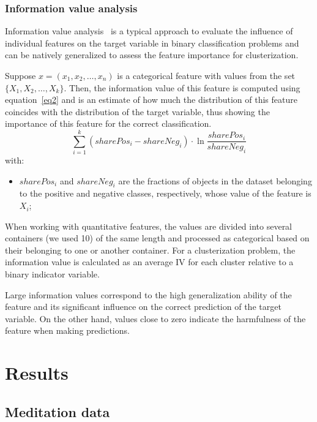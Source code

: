 \documentclass[pdflatex,sn-basic,Numbered]{sn-jnl}
\begin{document}
\subsubsection{Information value analysis}

Information value analysis~\cite{InformationValue} is a typical approach to evaluate the influence of individual features on the target variable in binary classification problems and can be natively generalized to assess the feature importance for clusterization.

Suppose $x=(x_1, x_2, \ldots, x_n)$ is a categorical feature with values from the set $\{ X_1, X_2, \ldots, X_k \}$. Then, the information value of this feature is computed using equation~\eqref{eq2} and is an estimate of how much the distribution of this feature coincides with the distribution of the target variable, thus showing the importance of this feature for the correct classification.
\begin{equation}
\sum_{i = 1}^{k} (sharePos_i - shareNeg_i) \cdot \ln \dfrac{sharePos_i}{shareNeg_i} \label{eq2}
\end{equation}
with:
\begin{itemize}
    \item
        $sharePos_i$ and $shareNeg_i$ are the fractions of objects in the dataset belonging to the positive and negative classes, respectively, whose value of the feature is $X_i$;
\end{itemize}

When working with quantitative features, the values are divided into several containers (we used 10) of the same length and processed as categorical based on their belonging to one or another container. For a clusterization problem, the information value is calculated as an average IV for each cluster relative to a binary indicator variable.

Large information values correspond to the high generalization ability of the feature and its significant influence on the correct prediction of the target variable. On the other hand, values close to zero indicate the harmfulness of the feature when making predictions.

\section{Results}

\subsection{Meditation data}
\end{document}
